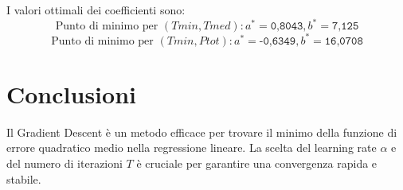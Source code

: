 \documentclass{article}
\begin{document}
I valori ottimali dei coefficienti sono:
\[
\text{Punto di minimo per } (Tmin, Tmed): a^* = \texttt{0,8043}, b^* = \texttt{7,125}
\]
\[
\text{Punto di minimo per } (Tmin, Ptot): a^* = \texttt{-0,6349}, b^* = \texttt{16,0708}
\]

\section{Conclusioni}
Il Gradient Descent è un metodo efficace per trovare il minimo della funzione di errore quadratico medio nella regressione lineare. La scelta del learning rate \(\alpha\) e del numero di iterazioni \(T\) è cruciale per garantire una convergenza rapida e stabile.
\end{document}

